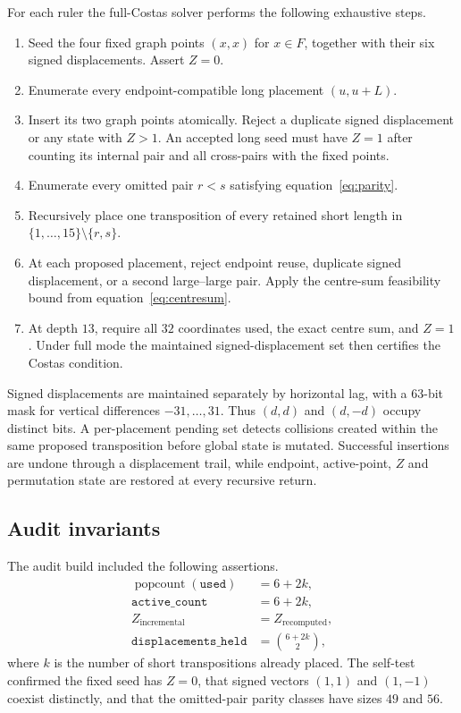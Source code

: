 \documentclass[11pt,a4paper]{article}
\theoremstyle{definition}\newtheorem{definition}[theorem]{Definition}\newtheorem{remark}[theorem]{Remark}
\begin{document}
For each ruler the full-Costas solver performs the following exhaustive steps.
\begin{enumerate}
\item Seed the four fixed graph points $(x,x)$ for $x\in F$, together with their six signed displacements.  Assert $Z=0$.
\item Enumerate every endpoint-compatible long placement $(u,u+L)$.
\item Insert its two graph points atomically.  Reject a duplicate signed displacement or any state with $Z>1$.  An accepted long seed must have $Z=1$ after counting its internal pair and all cross-pairs with the fixed points.
\item Enumerate every omitted pair $r<s$ satisfying equation~\eqref{eq:parity}.
\item Recursively place one transposition of every retained short length in $\{1,\ldots,15\}\setminus\{r,s\}$.
\item At each proposed placement, reject endpoint reuse, duplicate signed displacement, or a second large--large pair.  Apply the centre-sum feasibility bound from equation~\eqref{eq:centresum}.
\item At depth $13$, require all $32$ coordinates used, the exact centre sum, and $Z=1$.  Under full mode the maintained signed-displacement set then certifies the Costas condition.
\end{enumerate}

Signed displacements are maintained separately by horizontal lag, with a $63$-bit mask for vertical differences $-31,\ldots,31$.  Thus $(d,d)$ and $(d,-d)$ occupy distinct bits.  A per-placement pending set detects collisions created within the same proposed transposition before global state is mutated.  Successful insertions are undone through a displacement trail, while endpoint, active-point, $Z$ and permutation state are restored at every recursive return.

\subsection{Audit invariants}
The audit build included the following assertions.
\begin{align*}
\operatorname{popcount}(\texttt{used})&=6+2k,\\
\texttt{active\_count}&=6+2k,\\
Z_{\mathrm{incremental}}&=Z_{\mathrm{recomputed}},\\
\texttt{displacements\_held}&=\binom{6+2k}{2},
\end{align*}
where $k$ is the number of short transpositions already placed.  The self-test confirmed the fixed seed has $Z=0$, that signed vectors $(1,1)$ and $(1,-1)$ coexist distinctly, and that the omitted-pair parity classes have sizes $49$ and $56$.
\end{document}
